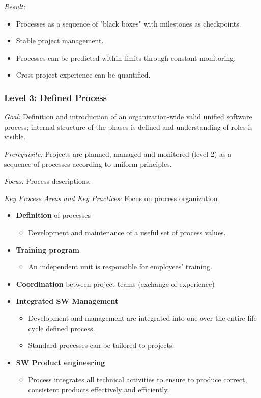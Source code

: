 \documentclass[11pt,a4paper]{article}
\begin{document}
\emph{Result:}
\begin {itemize} 
\item Processes as a sequence of "black boxes" with milestones as checkpoints.
\item Stable project management.
\item Processes can be predicted within limits through constant monitoring.
\item Cross-project experience can be quantified.
\end {itemize}

\subsubsection*{Level 3: Defined Process}

\emph{Goal:} Definition and introduction of an organization-wide valid unified
software process; internal structure of the phases is defined and
understanding of roles is visible.

\emph {Prerequisite:} Projects are planned, managed and monitored (level 2) as
a sequence of processes according to uniform principles.

\emph {Focus:} Process descriptions.

\emph {Key Process Areas and Key Practices:} Focus on process organization
\begin {itemize} 
\item \textbf {Definition} of processes
  \begin {itemize} 
  \item Development and maintenance of a useful set of process values.
  \end {itemize}
\item \textbf {Training program}
  \begin {itemize} 
  \item An independent unit is responsible for employees' training.
  \end {itemize}
\item \textbf {Coordination} between project teams (exchange of experience)
\item \textbf {Integrated SW Management}
  \begin {itemize} 
  \item Development and management are integrated into one over the entire
    life cycle defined process.
  \item Standard processes can be tailored to projects.
  \end {itemize}
\item \textbf {SW Product engineering}
  \begin {itemize} 
  \item Process integrates all technical activities to ensure to produce
    correct, consistent products effectively and efficiently.
  \end {itemize}
\end {itemize}
\end{document}
